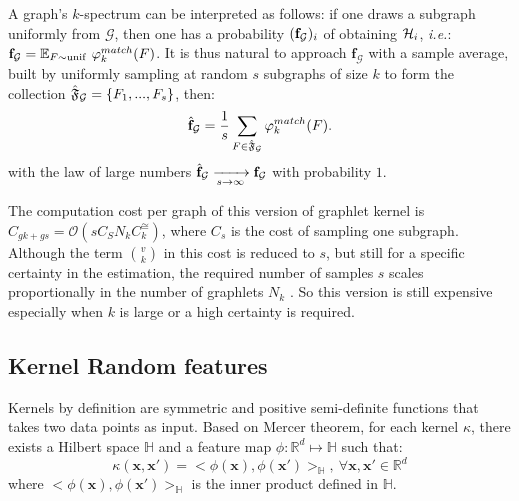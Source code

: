 \documentclass{article}
\begin{document}
A graph's $k$-spectrum can be interpreted as follows: if one draws a subgraph uniformly from $\mathcal{G}$, then one has a probability $(\mathbf{f}_{\mathcal{G}})_i$ of obtaining $\mathcal{H}_i$, \emph{i.e.}: $	\label{eq:histo_unif}
	\mathbf{f}_\mathcal{G} = \mathbb{E}_{F \sim {\rm unif}} ~\varphi^{match}_k(F)$. 
	It is thus natural to approach $\mathbf{f}_\mathcal{G}$ with a sample average, built by uniformly sampling at random $s$ subgraphs of size $k$ to form the collection 
$\hat{\mathfrak{F}}_{\mathcal{G}}=\{F_1,...,F_s\}$, then:
\begin{align}
	\label{eq:fhat_unif}
	\hat{\mathbf{f}}_\mathcal{G} =\frac{1}{s}\sum_{F\in\hat{\mathfrak{F}}_{\mathcal{G}}} \varphi^{match}_k(F).
\end{align}
with the law of large numbers  $\hat{\mathbf{f}}_{\mathcal{G}} \xrightarrow[s \to \infty]{} \mathbf{f}_\mathcal{G}$ with probability $1$.

The computation cost per graph of this version of graphlet kernel is $C_{gk + gs}= \mathcal{O}\left(s C_S N_k C^{\cong}_k\right)$, where $C_s$ is the cost of sampling one subgraph. Although the term $\binom{v}{k}$ in this cost is reduced to $s$, but still for a specific certainty in the estimation, the required number of samples $s$ scales proportionally in the number of graphlets $N_k$ \cite{graphlet_kernel}. So this version is still expensive especially when $k$ is large or a high certainty is required. 

\subsection{Kernel Random features}\label{sec:Random_features}
Kernels by definition are symmetric and positive  semi-definite functions that takes two data points as input. Based on Mercer theorem, for each kernel $\kappa$, there exists a Hilbert space $\mathbb{H}$ and a  feature map $\phi:\mathbb{R}^d\mapsto\mathbb{H}$ such that:  
	\begin{equation}
	\label{eq:kernel_main_equation}
	\kappa(\mathbf{x},\mathbf{x}')=<\phi(\mathbf{x}),\phi(\mathbf{x}')>_\mathbb{H},~ \forall \mathbf{x},\mathbf{x}'\in\mathbb{R}^d
	\end{equation}
	where $<\phi(\mathbf{x}),\phi(\mathbf{x}')>_\mathbb{H}$ is the inner product defined in $\mathbb{H}$.
\end{document}
